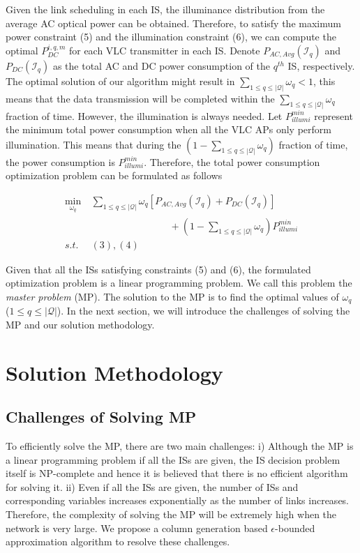 \documentclass[10pt,journal]{IEEEtran}
\begin{document}
Given the link scheduling in each IS, the illuminance distribution from the average AC optical power can be obtained. Therefore, to satisfy the maximum power constraint (5) and the illumination constraint (6), we can compute the optimal $P_{DC}^{i,q,m}$ for each VLC transmitter in each IS. Denote $P_{AC,Avg}(\mathcal{I}_{q})$ and $P_{DC}(\mathcal{I}_{q})$ as the total AC and DC power consumption of the $q^{th}$ IS, respectively. The optimal solution of our algorithm might result in $\sum_{1\leq q\leq|\mathcal{Q}|}\omega_{q}<1$, this means that the data transmission will be completed within the $\sum_{1\leq q\leq|\mathcal{Q}|}\omega_{q}$ fraction of time. However, the illumination is always needed. Let $P_{illumi}^{min}$ represent the minimum total power consumption when all the VLC APs only perform illumination. This means that during the $(1-\sum_{1\leq q\leq|\mathcal{Q}|}\omega_{q})$ fraction of time, the power consumption is $P_{illumi}^{min}$. Therefore, the total power consumption optimization problem can be formulated as follows

\begin{align}
\min_{\omega_{q}}~&\sum_{1\leq q\leq|\mathcal{Q}|}\omega_{q}[P_{AC,Avg}(\mathcal{I}_{q})+P_{DC}(\mathcal{I}_{q})]\nonumber\\
&\qquad\qquad\qquad\qquad+(1-\sum_{1\leq q\leq|\mathcal{Q}|}\omega_{q})P_{illumi}^{min}\nonumber\\
s.t.~&(3),(4)\nonumber
\end{align}


Given that all the ISs satisfying constraints (5) and (6), the formulated optimization problem is a linear programming problem. We call this problem the {\it master problem} (MP). The solution to the MP is to find the optimal values of $\omega_{q}$ ($1\leq q\leq|\mathcal{Q}|$). In the next section, we will introduce the challenges of solving the MP and our solution methodology.

\section{Solution Methodology}\label{solution_methodology}
\subsection{Challenges of Solving MP}
To efficiently solve the MP, there are two main challenges: i) Although the MP is a linear programming problem if all the ISs are given, the IS decision problem itself is NP-complete \cite{diestel2005graph} and hence it is believed that there is no efficient algorithm for solving it. ii) Even if all the ISs are given, the number of ISs and corresponding variables increases exponentially as the number of links increases. Therefore, the complexity of solving the MP will be extremely high when the network is very large. We propose a column generation based $\epsilon$-bounded approximation algorithm to resolve these challenges.
\end{document}

